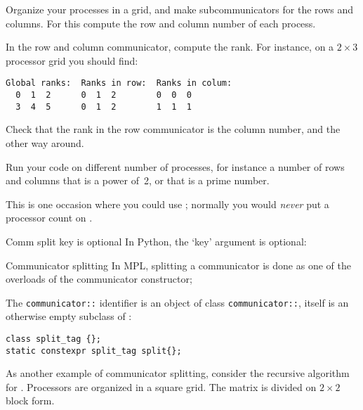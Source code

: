 \begin{exercise}
  \label{ex:rowcolcomm}
  Organize your processes in a grid, and make subcommunicators for
  the rows and columns. For this compute the row and column number of
  each process.

  In the row and column communicator, compute the rank. For instance,
  on a $2\times3$ processor grid you should find:
\begin{verbatim}
Global ranks:  Ranks in row:  Ranks in colum:
  0  1  2      0  1  2        0  0  0
  3  4  5      0  1  2        1  1  1
\end{verbatim}

  Check that the rank in the row communicator is the column number,
  and the other way around.

  Run your code on different number of processes, for instance a
  number of rows and columns that is a power of~2, or that is a prime number.
\begin{tacc}
    This is one occasion where you could use ;
    normally you would \emph{never} put a processor count on .
\end{tacc}
\end{exercise}

\begin{pythonnote}{Comm split key is optional}
  In Python, the `key' argument is optional:
\end{pythonnote}

\begin{mplnote}{Communicator splitting}
  \label{mpl::split}
  In \ac{MPL}, splitting a communicator is done as one of the overloads
  of the communicator constructor;

  \begin{mplimpl}
    The \lstinline+communicator::+ identifier
    is an object of class
    \lstinline+communicator::+,
    itself is an otherwise empty
    subclass of :
\begin{lstlisting}
class split_tag {};
static constexpr split_tag split{};
\end{lstlisting}
  \end{mplimpl}
\end{mplnote}


As another example of communicator splitting, consider the recursive
algorithm for .
%
%
Processors are organized in a square grid. The matrix is divided
on $2\times 2$ block form.

